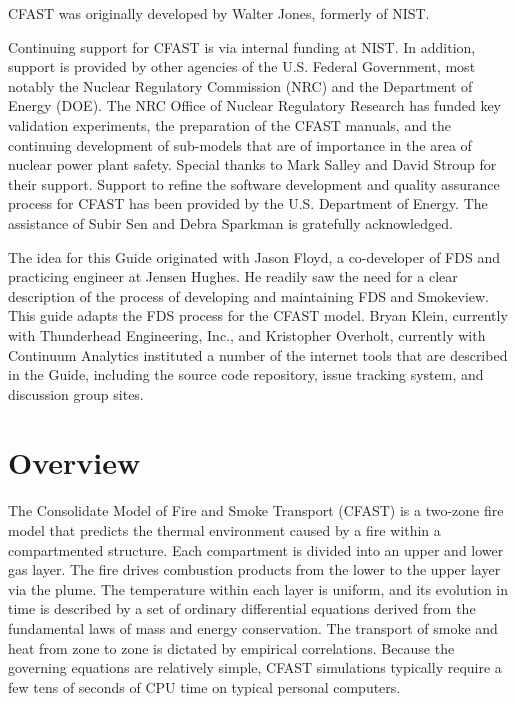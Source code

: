 \documentclass[12pt]{book}
\begin{document}
\label{acksection}

CFAST was originally developed by Walter Jones, formerly of NIST.

Continuing support for CFAST is via internal funding at NIST. In addition, support is provided by other agencies of the U.S. Federal Government, most notably the Nuclear Regulatory Commission (NRC) and the Department of Energy (DOE). The NRC Office of Nuclear Regulatory Research has funded key validation experiments, the preparation of the CFAST manuals, and the continuing development of sub-models that are of importance in the area of nuclear power plant safety. Special thanks to Mark Salley and David Stroup for their support. Support to refine the software development and quality assurance process for CFAST has been provided by the U.S. Department of Energy. The assistance of Subir Sen and Debra Sparkman is gratefully acknowledged.

The idea for this Guide originated with Jason Floyd, a co-developer of FDS and practicing engineer at Jensen Hughes. He readily saw the need for a clear description of the process of developing and maintaining FDS and Smokeview. This guide adapts the FDS process for the CFAST model.  Bryan Klein, currently with Thunderhead Engineering, Inc., and Kristopher Overholt, currently with Continuum Analytics instituted a number of the internet tools that are described in the Guide, including the source code repository, issue tracking system, and discussion group sites.


\tableofcontents

\listoffigures


\mainmatter

\chapter{Overview}

The Consolidate Model of Fire and Smoke Transport (CFAST) is a two-zone fire model that predicts the thermal environment caused by a fire within a compartmented structure. Each compartment is divided into an upper and lower gas layer. The fire drives combustion products from the lower to the upper layer via the plume. The temperature within each layer is uniform, and its evolution in time is described by a set of ordinary differential equations derived from the fundamental laws of mass and energy conservation. The transport of smoke and heat from zone to zone is dictated by empirical correlations. Because the governing equations are relatively simple, CFAST simulations typically require a few tens of seconds of CPU time on typical personal computers.
\end{document}
